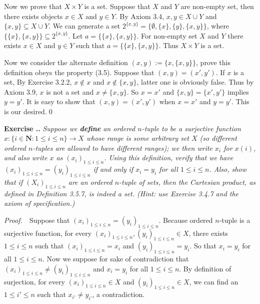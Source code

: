 \documentclass{book}
\newcommand{\pff}{\vspace{.25em}\noindent\emph{Proof.}~~}
\newcounter{Exercise}[section]
\renewcommand{\theExercise}{\thesection.\arabic{Exercise}.}
\newcommand{\new}{\vspace{1.5em}\noindent\textbf{{Exercise \stepcounter{Exercise}\textbf{\theExercise}}} }
\begin{document}
Now we prove that $X\times Y$ is a set. Suppose that $X$ and $Y$ are non-empty set, then there exists objects $x\in X$ and $y\in Y$. By Axiom 3.4, $x,y\in X\cup Y$ and $\{x,y\}\subseteq X\cup Y$. We can generate a set $2^{\{x,y\}}=\{\emptyset,\{x\},\{y\},\{x,y\}\}$, where $\{\{x\},\{x,y\}\}\subseteq 2^{\{x,y\}}$. Let $a=\{\{x\},\{x,y\}\}$. For non-empty set $X$ and $Y$ there exists $x\in X$ and $y\in Y$ such that $a=\{\{x\},\{x,y\}\}$. Thus $X\times Y$ is a set.

Now we consider the alternate definition $(x,y):=\{x,\{x,y\}\}$, prove this definition obeys the property (3.5). Suppose that $(x,y)=(x',y')$. If $x$ is a set, By Exercise 3.2.2, $x\notin x$ and $x\notin\{x,y\}$, latter one is obviously false. Thus by Axiom 3.9, $x$ is not a set and $x\ne\{x,y\}$. So $x=x'$ and $\{x,y\}=\{x',y'\}$ implies $y=y'$. It is easy to show that $(x,y)=(x',y')$ when $x=x'$ and $y=y'$. This is our desired.\qed

\new\emph{Suppose we \textbf{define} an ordered $n$-tuple to be a surjective function $x:\{i\in\mathbf{N}:1\leq i\leq n\}\to X$ whose range is some arbitrary set $X$ (so different ordered $n$-tuples are allowed to have different ranges); we then write $x_i$ for $x(i)$, and also write $x$ as $(x_i)_{1\leq i\leq n}$. Using this definition, verify that we have $(x_i)_{1\leq i\leq n}=(y_i)_{1\leq i\leq n}$ if and only if $x_i=y_i$ for all $1\leq i\leq n$. Also, show that if $(X_i)_{1\leq i\leq n}$ are an ordered $n$-tuple of sets, then the Cartesian product, as defined in Definition 3.5.7, is indeed a set. (Hint: use Exercise 3.4.7 and the axiom of specification.)}

\pff Suppose that $(x_i)_{1\leq i\leq n}=(y_i)_{1\leq i\leq n}$. Because ordered $n$-tuple is a surjective function, for every $(x_i)_{1\leq i\leq n},(y_i)_{1\leq i\leq n}\in X$, there exists $1\leq i\leq n$ such that $(x_i)_{1\leq i\leq n}=x_i$ and $(y_i)_{1\leq i\leq n}=y_i$. So that $x_i=y_i$ for all $1\leq i\leq n$. Now we suppose for sake of contradiction that $(x_i)_{1\leq i\leq n}\neq(y_i)_{1\leq i\leq n}$ and $x_i=y_i$ for all $1\leq i\leq n$. By definition of surjection, for every $(x_i)_{1\leq i\leq n}\in X$ and $(y_i)_{1\leq i\leq n}\in X$, we can find an $1\leq i'\leq n$ such that $x_{i'}\neq y_{i'}$, a contradiction.
\end{document}

